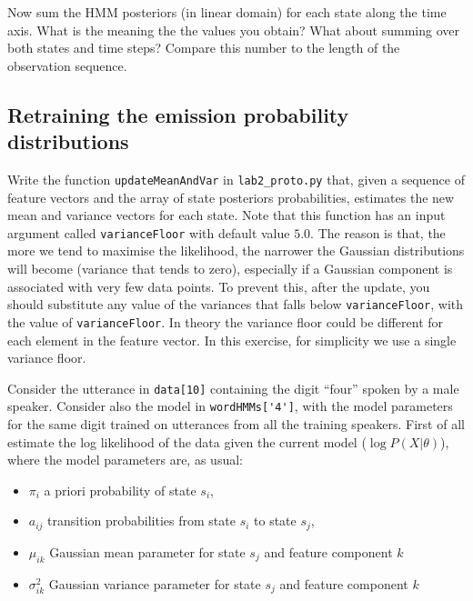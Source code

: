 \documentclass{nada-ten}
\begin{document}
Now sum the HMM posteriors (in linear domain) for each state along the time axis. What is the meaning the the values you obtain? What about summing over both states and time steps? Compare this number to the length of the observation sequence.

\subsection{Retraining the emission probability distributions}
Write the function \texttt{updateMeanAndVar} in \texttt{lab2\_proto.py} that, given a sequence of feature vectors and the array of state posteriors probabilities, estimates the new mean and variance vectors for each state. Note that this function has an input argument called \texttt{varianceFloor} with default value $5.0$. The reason is that, the more we tend to maximise the likelihood, the narrower the Gaussian distributions will become (variance that tends to zero), especially if a Gaussian component is associated with very few data points. To prevent this, after the update, you should substitute any value of the variances that falls below \texttt{varianceFloor}, with the value of \texttt{varianceFloor}. In theory the variance floor could be different for each element in the feature vector. In this exercise, for simplicity we use a single variance floor.

Consider the utterance in \texttt{data[10]} containing the digit ``four'' spoken by a male speaker. Consider also the model in \verb|wordHMMs['4']|, with the model parameters for the same digit trained on utterances from all the training speakers. 
First of all estimate the log likelihood of the data given the current model ($\log P(X|\theta)$), where the model parameters are, as usual:
\begin{itemize}
\item $\pi_i$ a priori probability of state $s_i$,
\item $a_{ij}$ transition probabilities from state $s_i$ to state $s_j$,
\item $\mu_{ik}$ Gaussian mean parameter for state $s_j$ and feature component $k$
\item $\sigma^2_{ik}$ Gaussian variance parameter for state $s_j$ and feature component $k$
\end{itemize}
\end{document}
